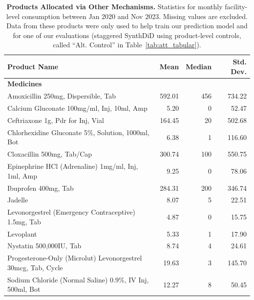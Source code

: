 \documentclass[12pt]{article}
\begin{document}
\begin{table}
\footnotesize
\centering
\caption{\textbf{Products Allocated via Other Mechanisms.} Statistics for monthly facility-level consumption between Jan 2020 and Nov 2023. Missing values are excluded. Data from these products were only used to help train our prediction model and for one of our evaluations (staggered SynthDiD using product-level controls, called ``Alt. Control'' in Table~\ref{tab:att_tabular}).}
\label{tab:medicine_consumption_treat0}
\begin{tabular}{p{8cm} r r r}
\toprule
\textbf{Product Name} & \textbf{Mean} & \textbf{Median} & \textbf{Std. Dev.} \\
\midrule
\multicolumn{4}{l}{\textbf{Medicines}\hfill} \\
\midrule
Amoxicillin 250mg, Dispersible, Tab & 592.01 & 456 & 734.22 \\
Calcium Gluconate 100mg/ml, Inj, 10ml, Amp & 5.20 & 0 & 52.47 \\
Ceftriaxone 1g, Pdr for Inj, Vial & 164.45 & 20 & 502.68 \\
Chlorhexidine Gluconate 5\%, Solution, 1000ml, Bot & 6.38 & 1 & 116.60 \\
Cloxacillin 500mg, Tab/Cap & 300.74 & 100 & 550.75 \\
Epinephrine HCl (Adrenaline) 1mg/ml, Inj, 1ml, Amp & 9.25 & 0 & 78.06 \\
Ibuprofen 400mg, Tab & 284.31 & 200 & 346.74 \\
Jadelle & 8.07 & 5 & 22.51 \\
Levonorgestrel (Emergency Contraceptive) 1.5mg, Tab & 4.87 & 0 & 15.75 \\
Levoplant & 5.33 & 1 & 17.90 \\
Nystatin 500,000IU, Tab & 8.74 & 4 & 24.61 \\
Progesterone-Only (Microlut) Levonorgestrel 30mcg, Tab, Cycle & 19.63 & 3 & 145.70 \\
Sodium Chloride (Normal Saline) 0.9\%, IV Inj, 500ml, Bot & 12.27 & 8 & 50.45 \\


\end{tabular}
\end{table}
\end{document}
